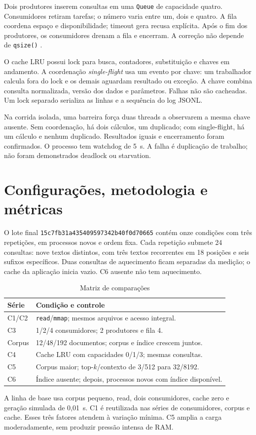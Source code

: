 \documentclass[12pt,a4paper]{article}
\newcommand{\secao}[1]{\clearpage\section{#1}}
\begin{document}
  Dois produtores inserem consultas em uma \texttt{Queue} de capacidade quatro. Consumidores retiram tarefas; o número varia entre um, dois e quatro. A fila coordena espaço e disponibilidade; timeout gera recusa explícita. Após o fim dos produtores, os consumidores drenam a fila e encerram. A correção não depende de \texttt{qsize()} \cite{queue}.
  
  O cache LRU possui lock para busca, contadores, substituição e chaves em andamento. A coordenação \textit{single-flight} usa um evento por chave: um trabalhador calcula fora do lock e os demais aguardam resultado ou exceção. A chave combina consulta normalizada, versão dos dados e parâmetros. Falhas não são cacheadas. Um lock separado serializa as linhas e a sequência do log JSONL.
  
  Na corrida isolada, uma barreira força duas threads a observarem a mesma chave ausente. Sem coordenação, há dois cálculos, um duplicado; com single-flight, há um cálculo e nenhum duplicado. Resultados iguais e encerramento foram confirmados. O processo tem watchdog de 5~s. A falha é duplicação de trabalho; não foram demonstrados deadlock ou starvation.
  
  \secao{Configurações, metodologia e métricas}
  O lote final \texttt{15c7fb31a435409597342b40f0d70665} contém onze condições com três repetições, em processos novos e ordem fixa. Cada repetição submete 24 consultas: nove textos distintos, com três textos recorrentes em 18 posições e seis sufixos específicos. Duas consultas de aquecimento ficam separadas da medição; o cache da aplicação inicia vazio. C6 ausente não tem aquecimento.
  
  \begin{table}[H]
  \centering\caption{Matriz de comparações}\label{tab:matriz}
  \begin{singlespace}\small
  \begin{tabularx}{\textwidth}{lX}
  \toprule\textbf{Série} & \textbf{Condição e controle}\\\midrule
  C1/C2 & \texttt{read}/\texttt{mmap}; mesmos arquivos e acesso integral.\\
  C3 & 1/2/4 consumidores; 2 produtores e fila 4.\\
  Corpus & 12/48/192 documentos; corpus e índice crescem juntos.\\
  C4 & Cache LRU com capacidades 0/1/3; mesmas consultas.\\
  C5 & Corpus maior; top-$k$/contexto de 3/512 para 32/8192.\\
  C6 & Índice ausente; depois, processos novos com índice disponível.\\\bottomrule
  \end{tabularx}\end{singlespace}
  \end{table}
  A linha de base usa corpus pequeno, read, dois consumidores, cache zero e geração simulada de 0,01~s. C1 é reutilizada nas séries de consumidores, corpus e cache. Esses três fatores atendem à variação mínima. C5 amplia a carga moderadamente, sem produzir pressão intensa de RAM.
  
\end{document}
